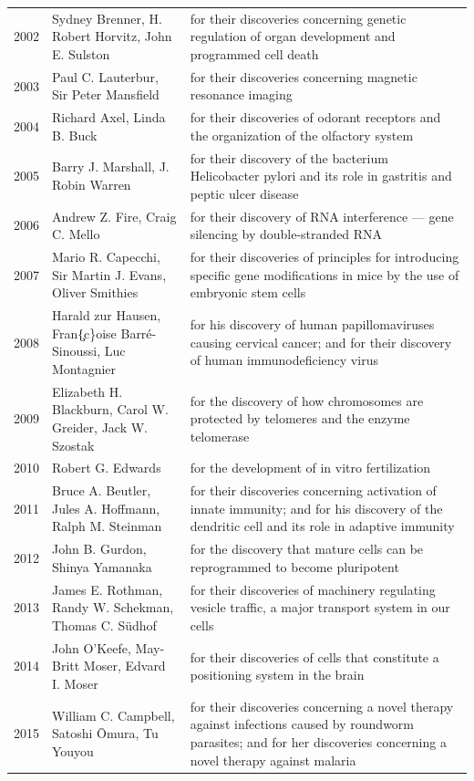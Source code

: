 \documentclass[12pt,a4paper]{book}
\begin{document}
{\begin{longtable}{cp{3.2cm}p{5.5cm}}
2002 & Sydney Brenner, H. Robert Horvitz, John E. Sulston & for their discoveries concerning genetic regulation of organ development and programmed cell death \\
2003 & Paul C. Lauterbur, Sir Peter Mansfield & for their discoveries concerning magnetic resonance imaging \\
2004 & Richard Axel, Linda B. Buck & for their discoveries of odorant receptors and the organization of the olfactory system \\
2005 & Barry J. Marshall, J. Robin Warren & for their discovery of the bacterium Helicobacter pylori and its role in gastritis and peptic ulcer disease \\
2006 & Andrew Z. Fire, Craig C. Mello & for their discovery of RNA interference — gene silencing by double-stranded RNA \\
2007 & Mario R. Capecchi, Sir Martin J. Evans, Oliver Smithies & for their discoveries of principles for introducing specific gene modifications in mice by the use of embryonic stem cells \\
2008 & Harald zur Hausen, Fran\c\{c\}oise Barr\'e-Sinoussi, Luc Montagnier & for his discovery of human papillomaviruses causing cervical cancer; and for their discovery of human immunodeficiency virus \\
2009 & Elizabeth H. Blackburn, Carol W. Greider, Jack W. Szostak & for the discovery of how chromosomes are protected by telomeres and the enzyme telomerase \\
2010 & Robert G. Edwards & for the development of in vitro fertilization \\
2011 & Bruce A. Beutler, Jules A. Hoffmann, Ralph M. Steinman & for their discoveries concerning activation of innate immunity; and for his discovery of the dendritic cell and its role in adaptive immunity \\
2012 & John B. Gurdon, Shinya Yamanaka & for the discovery that mature cells can be reprogrammed to become pluripotent \\
2013 & James E. Rothman, Randy W. Schekman, Thomas C. S\"udhof & for their discoveries of machinery regulating vesicle traffic, a major transport system in our cells \\
2014 & John O'Keefe, May-Britt Moser, Edvard I. Moser & for their discoveries of cells that constitute a positioning system in the brain \\
2015 & William C. Campbell, Satoshi \=Omura, Tu Youyou & for their discoveries concerning a novel therapy against infections caused by roundworm parasites; and for her discoveries concerning a novel therapy against malaria \\

\end{longtable}}
\end{document}
